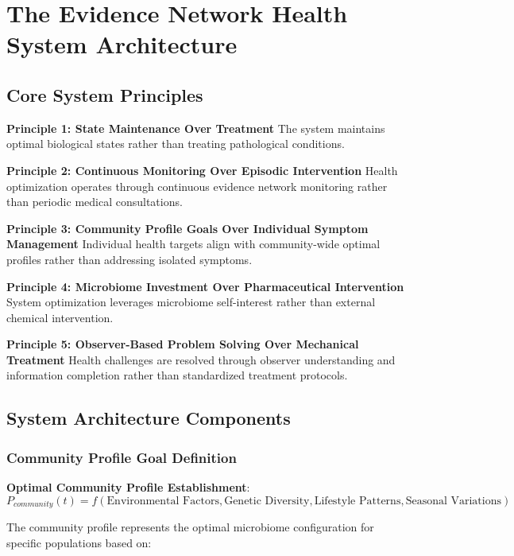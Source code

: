 \documentclass[12pt,a4paper]{article}
\begin{document}
\section{The Evidence Network Health System Architecture}

\subsection{Core System Principles}

\textbf{Principle 1: State Maintenance Over Treatment}
The system maintains optimal biological states rather than treating pathological conditions.

\textbf{Principle 2: Continuous Monitoring Over Episodic Intervention}  
Health optimization operates through continuous evidence network monitoring rather than periodic medical consultations.

\textbf{Principle 3: Community Profile Goals Over Individual Symptom Management}
Individual health targets align with community-wide optimal profiles rather than addressing isolated symptoms.

\textbf{Principle 4: Microbiome Investment Over Pharmaceutical Intervention}
System optimization leverages microbiome self-interest rather than external chemical intervention.

\textbf{Principle 5: Observer-Based Problem Solving Over Mechanical Treatment}
Health challenges are resolved through observer understanding and information completion rather than standardized treatment protocols.

\subsection{System Architecture Components}

\subsubsection{Community Profile Goal Definition}

\textbf{Optimal Community Profile Establishment}:
\begin{equation}
P_{community}(t) = f(\text{Environmental Factors}, \text{Genetic Diversity}, \text{Lifestyle Patterns}, \text{Seasonal Variations})
\end{equation}

The community profile represents the optimal microbiome configuration for specific populations based on:
\end{document}
